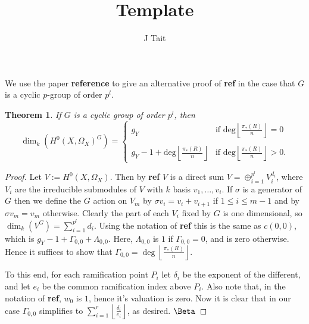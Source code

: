 \documentclass[11pt]{article} %
\title{Template}
\author{J Tait}
\newtheorem{thm}{Theorem}
\theoremstyle{remark}\newtheorem*{rem}{Remark}
\begin{document}
\maketitle


 We use the paper {\bf reference} to give an alternative proof of {\bf ref} in the case that $G$ is a cyclic $p$-group of order $p^l$.

\begin{thm}
  If $G$ is a cyclic group of order $p^l$, then
\[\dim_k \left(H^0(X,\Omega_X)^G\right) = \left\{
\begin{array}{ll}
g_Y & \textrm{if } \textrm{deg} \left\lfloor \frac{\pi_*(R)}{n} \right\rfloor = 0\\
\\
g_Y-1 + \textrm{deg}\left\lfloor \frac{\pi_*(R)}{n} \right\rfloor &
\textrm{if } \textrm{deg}\left\lfloor \frac{\pi_*(R)}{n} \right\rfloor > 0.
\end{array}\right.\]
\end{thm}
\begin{proof}
Let $V:=H^0(X,\Omega_X)$. 
Then by {\bf ref} $V$ is a direct sum $V=\oplus_{i=1}^{p^l} V_i^{d_i}$, where $V_i$ are the irreducible submodules of $V$ with $k$ basis $v_1,\ldots ,v_i$.
If $\sigma$ is a generator of $G$ then we define the $G$ action on $V_m$ by $\sigma v_i=v_i + v_{i+1}$ if $1\leq i \leq m-1$ and by $\sigma v_m=v_m$ otherwise.
Clearly the part of each $V_i$ fixed by $G$ is one dimensional, so $\dim_k(V^G)=\sum_{i=1}^{p^l} d_i$.
Using the notation of {\bf ref} this is the same as $c(0,0)$, which is $g_Y-1+\Gamma_{0,0}+\Lambda_{0,0}$.
Here, $\Lambda_{0,0}$ is $1$ if $\Gamma_{0,0}=0$, and is zero otherwise.
Hence it suffices to show that $\Gamma_{0,0}=\deg \left\lfloor \frac{\pi_*(R)}{n} \right\rfloor$.

To this end, for each ramification point $P_i$ let $\delta_i$ be the exponent of the different, and let $e_i$ be the common ramification index above $P_i$.
Also note that, in the notation of {\bf ref}, $w_0$ is $1$, hence it's valuation is zero.
Now it is clear that in our case $\Gamma_{0,0}$ simplifies to $\sum_{i=1}^r\left\lfloor \frac{\delta_i}{e_i} \right\rfloor$, as desired.
$\Beta$
\end{proof}






\end{document}
